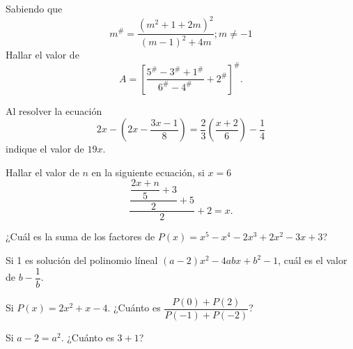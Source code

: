 \begin{section-problem}
    Sabiendo que
    \[
        m^{\#} = \frac{(m^2 + 1 + 2m)^2}{(m - 1)^2 + 4m}; m \neq -1
    \]
    Hallar el valor de
    \[A =  \left[\frac{5^{\#} - 3^{\#} + 1^{\#}}{6^{\#} - 4^{\#}} + 2^{\#}\right]^{\#}.\]
\end{section-problem}

\begin{section-problem}
    Al resolver la ecuación
    \[2x - \left( 2x - \frac{3x - 1}{8} \right) = \frac{2}{3} \left( \frac{x + 2}{6} \right) - \frac{1}{4}\]
    indique el valor de $19x$.
\end{section-problem}

\begin{section-problem}
    Hallar el valor de $n$ en la siguiente ecuación, si $x = 6$
    \[\dfrac{\dfrac{\dfrac{2x + n}{5} + 3}{2} + 5}{2} + 2 = x.\]
\end{section-problem}

\begin{section-problem}
    ¿Cuál es la suma de los factores de $P(x) = x^5 - x^4 - 2x^3 + 2x^2 - 3x + 3$?
\end{section-problem}

\begin{section-problem}
    Si 1 es solución del polinomio líneal $(a - 2)x^2 - 4abx + b^2 - 1$, cuál es el valor de $b - \dfrac{1}{b}$.
\end{section-problem}

\begin{section-problem}
    Si $P(x) = 2x^2 + x - 4$.
    ¿Cuánto es $\dfrac{P(0) + P(2)}{P(-1) + P(-2)}$?
\end{section-problem}

\begin{section-problem}
    Si $\boxed{a - 2} =  a^2$.
    ¿Cuánto es $\boxed{3} +\boxed{\boxed{1}}$?
\end{section-problem}